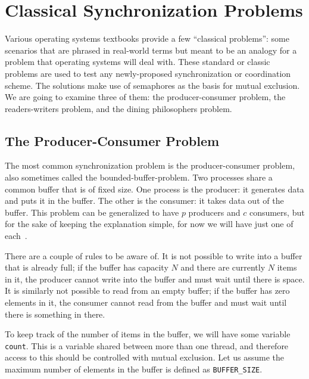 




\section*{Classical Synchronization Problems}

Various operating systems textbooks provide a few ``classical problems'': some scenarios that are phrased in real-world terms but meant to be an analogy for a problem that operating systems will deal with. These standard or classic problems are used to test any newly-proposed synchronization or coordination scheme. The solutions make use of semaphores as the basis for mutual exclusion. We are going to examine three of them: the producer-consumer problem, the readers-writers problem, and the dining philosophers problem.

\subsection*{The Producer-Consumer Problem}
The most common synchronization problem is the producer-consumer problem, also sometimes called the bounded-buffer-problem. Two processes share a common buffer that is of fixed size. One process is the producer: it generates data and puts it in the buffer. The other is the consumer: it takes data out of the buffer. This problem can be generalized to have $p$ producers and $c$ consumers, but for the sake of keeping the explanation simple, for now we will have just one of each~\cite{mos}.

There are a couple of rules to be aware of. It is not possible to write into a buffer that is already full; if the buffer has capacity $N$ and there are currently $N$ items in it, the producer cannot write into the buffer and must wait until there is space. It is similarly not possible to read from an empty buffer; if the buffer has zero elements in it, the consumer cannot read from the buffer and must wait until there is something in there. 

To keep track of the number of items in the buffer, we will have some variable \texttt{count}. This is a variable shared between more than one thread, and therefore access to this should be controlled with mutual exclusion. Let us assume the maximum number of elements in the buffer is defined as \texttt{BUFFER\_SIZE}.

